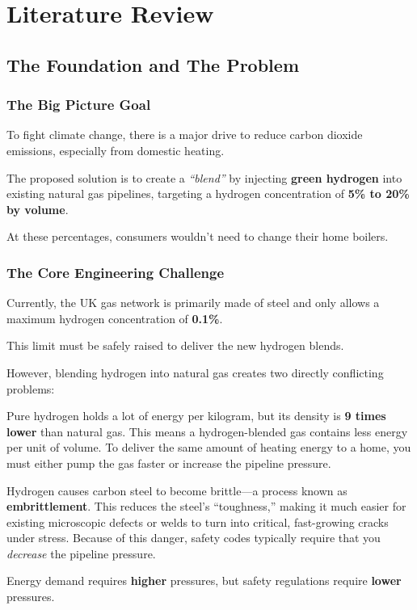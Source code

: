 \documentclass[12pt,a4paper]{report}
\begin{document}
\chapter{Literature Review}

\section{The Foundation and The Problem}

\subsection{The Big Picture Goal}

To fight climate change, there is a major drive to reduce carbon dioxide emissions, especially from domestic heating.

The proposed solution is to create a \textit{``blend''} by injecting \textbf{green hydrogen} into existing natural gas pipelines, targeting a hydrogen concentration of \textbf{5\% to 20\% by volume}.

At these percentages, consumers wouldn't need to change their home boilers.

\subsection{The Core Engineering Challenge}

Currently, the UK gas network is primarily made of steel and only allows a maximum hydrogen concentration of \textbf{0.1\%}.

This limit must be safely raised to deliver the new hydrogen blends.

However, blending hydrogen into natural gas creates two directly conflicting problems:

\begin{description}[style=nextline, font=\normalfont\bfseries, leftmargin=1.5em]

  \item[The Energy Density Problem:]
  Pure hydrogen holds a lot of energy per kilogram, but its density is \textbf{9 times lower} than natural gas. This means a hydrogen-blended gas contains less energy per unit of volume. To deliver the same amount of heating energy to a home, you must either pump the gas faster or increase the pipeline pressure.

  \item[The Material Safety Problem:]
  Hydrogen causes carbon steel to become brittle---a process known as \textbf{embrittlement}. This reduces the steel's ``toughness,'' making it much easier for existing microscopic defects or welds to turn into critical, fast-growing cracks under stress. Because of this danger, safety codes typically require that you \textit{decrease} the pipeline pressure.

  \item[The Conflict:]
  Energy demand requires \textbf{higher} pressures, but safety regulations require \textbf{lower} pressures.

\end{description}
\end{document}
